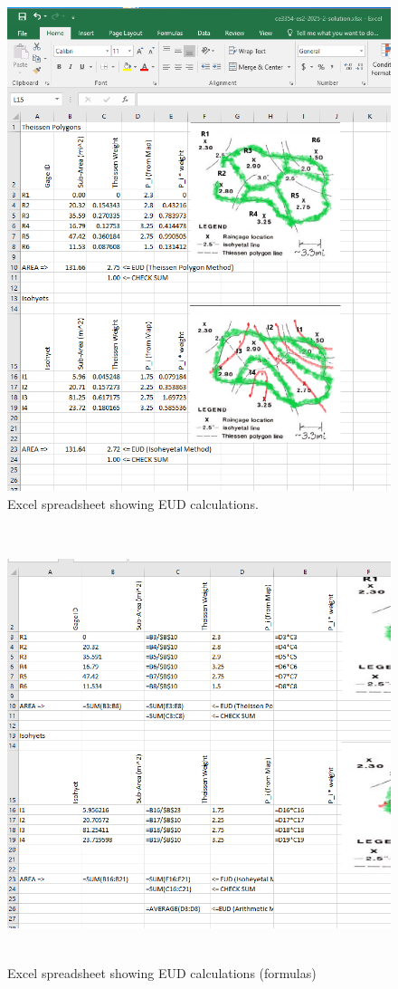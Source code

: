 \documentclass[12pt]{article}
\begin{document}
\begin{enumerate}
\begin{figure}[h!] %
   \centering
   \includegraphics[width=5in]{es2-9xls.png} 
   \caption{Excel spreadsheet showing EUD calculations.}
   \label{fig:es2-9xls}
\end{figure}
\clearpage

\begin{figure}[h!] %
   \centering
   \includegraphics[height=5in]{es2-9func.png} 
   \caption{Excel spreadsheet showing EUD calculations (formulas)}
   \label{fig:es2-9func}
\end{figure}


\end{enumerate}
\end{document}
